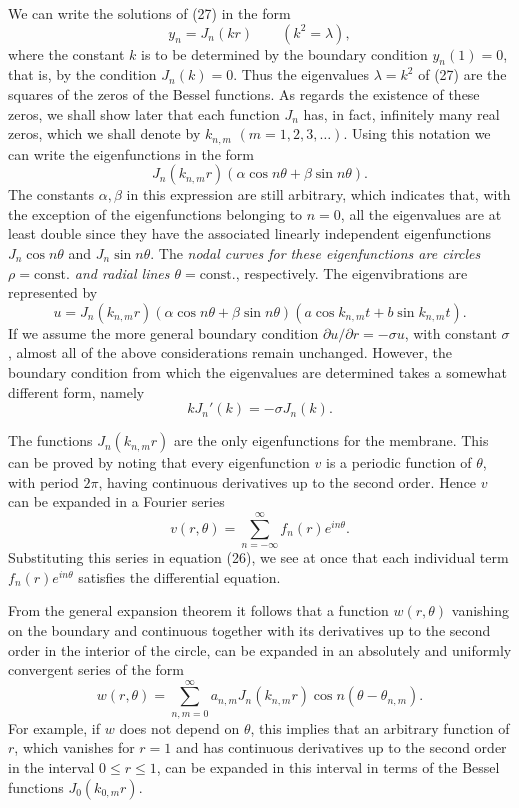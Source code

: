 We can write the solutions of (27) in the form
\begin{equation}\tag{30}
y_n=J_n(kr)\qquad(k^2=\lambda),
\end{equation}
where the constant $k$ is to be determined by the boundary condition $y_n(1)=0$, that is, by the condition $J_n(k)=0$. Thus the eigenvalues $\lambda=k^2$ of (27) are the squares of the zeros of the Bessel functions. As regards the existence of these zeros, we shall show later that each function $J_n$ has, in fact, infinitely many real zeros, which we shall denote by $k_{n,m}$ $(m=1,2,3,\ldots)$. Using this notation we can write the eigenfunctions in the form
\[
J_n(k_{n,m}r)(\alpha\cos n\theta+\beta\sin n\theta).
\]
The constants $\alpha,\beta$ in this expression are still arbitrary, which indicates that, with the exception of the eigenfunctions belonging to $n=0$, all the eigenvalues are at least double since they have the associated linearly independent eigenfunctions $J_n\cos n\theta$ and $J_n\sin n\theta$. The \emph{nodal curves for these eigenfunctions are circles $\rho=\mathrm{const.}$ and radial lines $\theta=\mathrm{const.}$}, respectively. The eigenvibrations are represented by
\[
u=J_n(k_{n,m}r)(\alpha\cos n\theta+\beta\sin n\theta)
(a\cos k_{n,m}t+b\sin k_{n,m}t).
\]
If we assume the more general boundary condition $\partial u/\partial r=-\sigma u$, with constant $\sigma$, almost all of the above considerations remain unchanged. However, the boundary condition from which the eigenvalues are determined takes a somewhat different form, namely
\[
kJ_n'(k)=-\sigma J_n(k).
\]

The functions $J_n(k_{n,m}r)$ are the only eigenfunctions for the membrane. This can be proved by noting that every eigenfunction $v$ is a periodic function of $\theta$, with period $2\pi$, having continuous derivatives up to the second order. Hence $v$ can be expanded in a Fourier series
\[
v(r,\theta)=\sum_{n=-\infty}^{\infty}f_n(r)e^{in\theta}.
\]
Substituting this series in equation (26), we see at once that each individual term $f_n(r)e^{in\theta}$ satisfies the differential equation.

From the general expansion theorem it follows that a function $w(r,\theta)$ vanishing on the boundary and continuous together with its derivatives up to the second order in the interior of the circle, can be expanded in an absolutely and uniformly convergent series of the form
\[
w(r,\theta)=\sum_{n,m=0}^{\infty}a_{n,m}J_n(k_{n,m}r)\cos n(\theta-\theta_{n,m}).
\]
For example, if $w$ does not depend on $\theta$, this implies that an arbitrary function of $r$, which vanishes for $r=1$ and has continuous derivatives up to the second order in the interval $0\le r\le1$, can be expanded in this interval in terms of the Bessel functions $J_0(k_{0,m}r)$.


